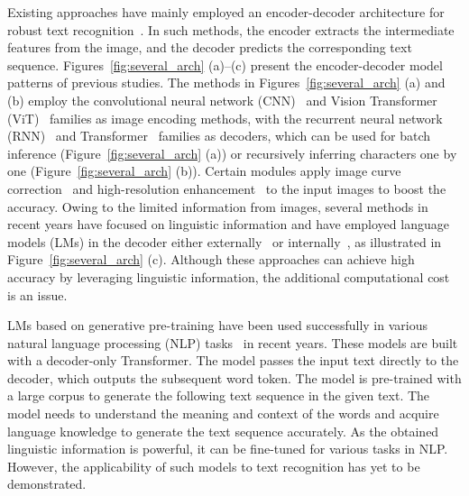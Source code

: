 \documentclass[10pt,twocolumn,letterpaper]{article}
\begin{document}
Existing approaches have mainly employed an encoder-decoder architecture for robust text recognition~\cite{fang2021ABINet, shi2016crnn, bautista2022parseq}.
In such methods, the encoder extracts the intermediate features from the image, and the decoder predicts the corresponding text sequence.
Figures~\ref{fig:several_arch} (a)--(c) present the encoder-decoder model patterns of previous studies.
The methods in Figures~\ref{fig:several_arch} (a) and (b) employ the convolutional neural network (CNN)~\cite{he2016resnet} and Vision Transformer (ViT)~\cite{dosovitskiy2020vit} families as image encoding methods, with the recurrent neural network (RNN)~\cite{hochreiter1997lstm} and Transformer~\cite{vaswani2017transformer} families as decoders, which can be used for batch inference (Figure~\ref{fig:several_arch} (a)) or recursively inferring characters one by one (Figure~\ref{fig:several_arch} (b)).
Certain modules apply image curve correction~\cite{baek2021TRBA} and high-resolution enhancement~\cite{mou2020plugnet} to the input images to boost the accuracy.
Owing to the limited information from images, several methods in recent years have focused on linguistic information and have employed language models (LMs) in the decoder either externally~\cite{fang2021ABINet} or internally~\cite{bautista2022parseq, li2021trocr}, as illustrated in Figure~\ref{fig:several_arch} (c).
Although these approaches can achieve high accuracy by leveraging linguistic information, the additional computational cost is an issue.

LMs based on generative pre-training have been used successfully in various natural language processing (NLP) tasks~\cite{radford2018gpt, radford2019language} in recent years.
These models are built with a decoder-only Transformer. 
The model passes the input text directly to the decoder, which outputs the subsequent word token.
The model is pre-trained with a large corpus to generate the following text sequence in the given text.
The model needs to understand the meaning and context of the words and acquire language knowledge to generate the text sequence accurately.
As the obtained linguistic information is powerful, it can be fine-tuned for various tasks in NLP.
However, the applicability of such models to text recognition has yet to be demonstrated.
\end{document}
